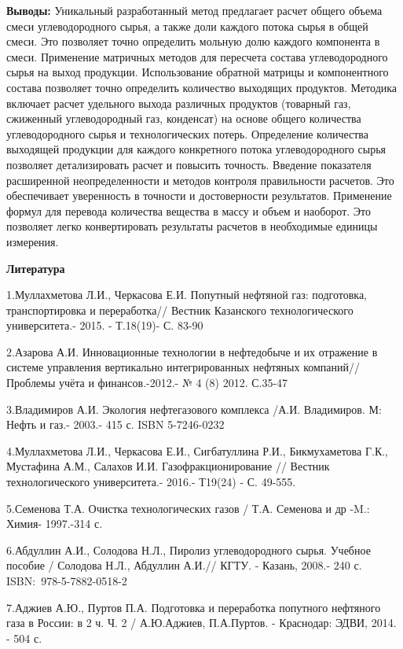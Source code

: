 {\bfseries Выводы:} Уникальный разработанный метод предлагает расчет общего
объема смеси углеводородного сырья, а также доли каждого потока сырья в
общей смеси. Это позволяет точно определить мольную долю каждого
компонента в смеси. Применение матричных методов для пересчета состава
углеводородного сырья на выход продукции. Использование обратной матрицы
и компонентного состава позволяет точно определить количество выходящих
продуктов. Методика включает расчет удельного выхода различных продуктов
(товарный газ, сжиженный углеводородный газ, конденсат) на основе общего
количества углеводородного сырья и технологических потерь. Определение
количества выходящей продукции для каждого конкретного потока
углеводородного сырья позволяет детализировать расчет и повысить
точность. Введение показателя расширенной неопределенности и методов
контроля правильности расчетов. Это обеспечивает уверенность в точности
и достоверности результатов. Применение формул для перевода количества
вещества в массу и объем и наоборот. Это позволяет легко конвертировать
результаты расчетов в необходимые единицы измерения.

{\bfseries Литература}

1.Муллахметова Л.И., Черкасова Е.И. Попутный нефтяной газ: подготовка,
транспортировка и переработка// Вестник Казанского технологического
университета.- 2015. - Т.18(19)- С. 83-90

2.Азарова А.И. Инновационные технологии в нефтедобыче и их отражение в
системе управления вертикально интегрированных нефтяных компаний//
Проблемы учёта и финансов.-2012.- № 4 (8) 2012. С.35-47

3.Владимиров А.И. Экология нефтегазового комплекса /А.И. Владимиров. М:
Нефть и газ.- 2003.- 415 с. ISBN 5-7246-0232

4.Муллахметова Л.И., Черкасова Е.И., Сигбатуллина Р.И., Бикмухаметова
Г.К., Мустафина А.М., Салахов И.И. Газофракционирование // Вестник
технологического университета.- 2016.- Т19(24) - С. 49-555.

5.Семенова Т.А. Очистка технологических газов / Т.А. Семенова и др -M.:
Химия- 1997.-314 с.

6.Абдуллин А.И., Солодова Н.Л., Пиролиз углеводородного сырья. Учебное
пособие / Солодова Н.Л., Абдуллин А.И.// КГТУ. - Казань, 2008.- 240 с.
ISBN:~978-5-7882-0518-2

7.Аджиев А.Ю., Пуртов П.А. Подготовка и переработка попутного нефтяного
газа в России: в 2 ч. Ч. 2 / А.Ю.Аджиев, П.А.Пуртов. - Краснодар: ЭДВИ,
2014. - 504 с.

